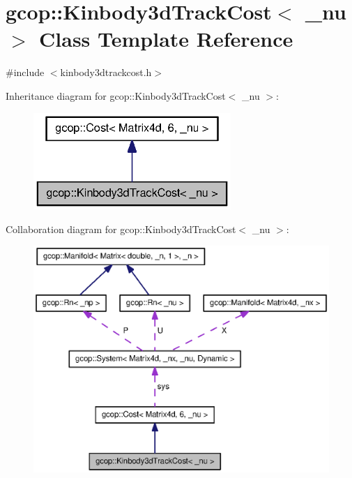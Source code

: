 \section{gcop\-:\-:\-Kinbody3d\-Track\-Cost$<$ \-\_\-nu $>$ \-Class \-Template \-Reference}
\label{classgcop_1_1Kinbody3dTrackCost}


{\ttfamily \#include $<$kinbody3dtrackcost.\-h$>$}



\-Inheritance diagram for gcop\-:\-:\-Kinbody3d\-Track\-Cost$<$ \-\_\-nu $>$\-:\nopagebreak
\begin{figure}[H]
\begin{center}
\leavevmode
\includegraphics[width=212pt]{classgcop_1_1Kinbody3dTrackCost__inherit__graph}
\end{center}
\end{figure}


\-Collaboration diagram for gcop\-:\-:\-Kinbody3d\-Track\-Cost$<$ \-\_\-nu $>$\-:\nopagebreak
\begin{figure}[H]
\begin{center}
\leavevmode
\includegraphics[width=350pt]{classgcop_1_1Kinbody3dTrackCost__coll__graph}
\end{center}
\end{figure}
